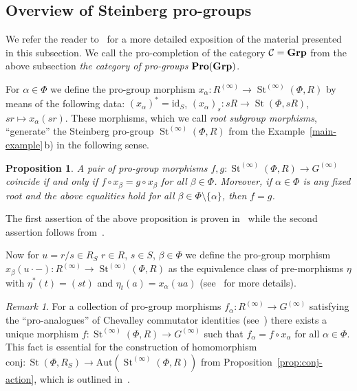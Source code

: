 \documentclass[oneside, 11pt]{amsart}
\numberwithin{equation}{section}
\newtheorem{proposition}[lemma]{Proposition}
\newcommand{\St}{\mathop{\mathrm{St}}\nolimits}
\theoremstyle{definition}
\theoremstyle{definition}
\theoremstyle{remark}
\newtheorem{rem}[lemma]{Remark}
\newcommand{\catname}[1]{{\normalfont\textbf{#1}}} %
\begin{document}
\subsection{Overview of Steinberg pro-groups}
\label{pro-groups}
We refer the reader to~\cite[\S~2]{LSV20} for a more detailed exposition of the material presented in this subsection. We call the pro-completion of the category $\mathcal C=\catname{Grp}$ from the above subsection {\it the category of pro-groups} $\catname{Pro}(\catname{Grp})$.

For $\alpha \in \Phi$ we define the pro-group morphism $x_\alpha \colon R^{(\infty)} \to \St^{(\infty)}(\Phi, R)$ by means of the following data: $(x_\alpha)^* = \mathrm{id}_S$, $(x_\alpha)_s \colon sR \to \St(\Phi, sR)$, $sr \mapsto x_\alpha(sr)$. These morphisms, which we call {\it root subgroup morphisms}, ``generate'' the Steinberg pro-group $\St^{(\infty)}(\Phi, R)$ from the Example~\ref{main-example}\,b) in the following sense.
\begin{proposition}
\label{generators}
A pair of pro-group morphisms $f, g \colon \St^{(\infty)}(\Phi, R) \to G^{(\infty)}$ coincide if and only if $f \circ x_\beta = g \circ x_\beta$ for all $\beta \in \Phi$.
Moreover, if $\alpha \in \Phi$ is any fixed root and the above equalities hold for all $\beta \in \Phi\setminus\{\alpha\}$, then $f=g$.
\end{proposition}
The first assertion of the above proposition is proven in~\cite[Lemma~2.16]{LSV20} while the second assertion follows from~\cite[Lemma~3.2]{LSV20}.

Now for $u=r/s\in R_S$ $r\in R$, $s\in S$, $\beta\in\Phi$ we define the pro-group morphism $x_\beta(u\cdot-)\colon R^{(\infty)}\rightarrow\St^{(\infty)}(\Phi, R)$ as the equivalence class of pre-morphisms $\eta$ with $\eta^*(t)=(st)$ and $\eta_t(a)=x_\alpha(ua)$ (see~\cite[Subsection~4.2]{LSV20} for more details).
\begin{rem}
For a collection of pro-group morphisms $f_\alpha \colon R^{(\infty)} \to G^{(\infty)}$ satisfying the ``pro-analogues'' of Chevalley commutator identities (see~\cite[Remark~2.15]{LSV20}) there exists a unique morphism $f \colon \St^{(\infty)}(\Phi, R) \to G^{(\infty)}$ such that $f_\alpha = f \circ x_\alpha$ for all $\alpha\in\Phi$. This fact is essential for the construction of homomorphism $\mathrm{conj}\colon \St(\Phi, R_S) \to \mathrm{Aut}(\St^{(\infty)}(\Phi, R))$ from Proposition~\ref{prop:conj-action}, which is outlined in~\cite[Lemma~4.2, Proposition~4.3]{LSV20}.
\end{rem}
\end{document}
